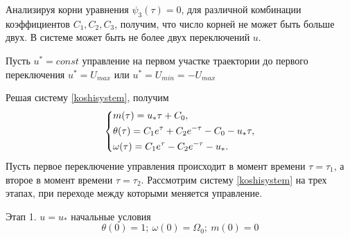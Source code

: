 \documentclass[a4paper,14pt]{article}
\theoremstyle{plain} %
\theoremstyle{definition} %
\theoremstyle{remark} %
\begin{document}
{Анализируя корни уравнения $\psi_3(\tau)=0$, для различной комбинации
коэффициентов $C_1,C_2,C_3$, получим, что число корней не может быть больше двух. В системе может быть не более двух переключений $u$.

Пусть $u^*=const$ управление на первом участке траектории до первого переключения $u^*=U_{max}$ или $u^*=U_{min}=-U_{max}$

Решая систему \eqref{koshisystem}, получим
\begin{equation}\label{solvekoshi}
    \left\{ {\begin{aligned}
                 & m(\tau) = u_*\tau+C_0, \hfill                              \\
                 & \theta(\tau) = C_1e^\tau+C_2e^{-\tau}-C_0-u_*\tau , \hfill \\
                 & \omega(\tau) = C_1e^\tau-C_2e^{-\tau}-u_*  . \hfill        \\
            \end{aligned}} \right.
\end{equation}
Пусть первое переключение управления происходит в момент времени
$\tau=\tau_1$, а второе в момент времени
$\tau=\tau_2$. Рассмотрим систему \eqref{koshisystem} на трех этапах,
при переходе между которыми меняется управление.

Этап 1. $u=u_*$ начальные условия
\[
    \theta(0)=1;\ \omega(0)=\Omega_0;\ m(0)=0
\]

}
\end{document}
